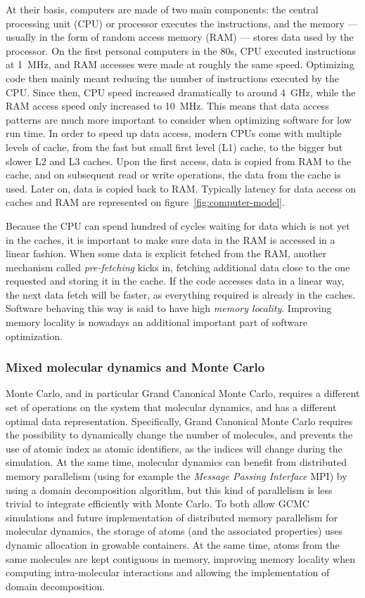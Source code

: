 \documentclass[thesis]{subfiles}
\begin{document}
At their basis, computers are made of two main components: the central
processing unit (CPU) or processor executes the instructions, and the memory ---
usually in the form of random access memory (RAM) --- stores data used by the
processor. On the first personal computers in the 80s, CPU executed instructions
at \SI{1}{MHz}, and RAM accesses were made at roughly the same speed. Optimizing
code then mainly meant reducing the number of instructions executed by the CPU.
Since then, CPU speed increased dramatically to around \SI{4}{GHz}, while the
RAM access speed only increased to \SI{10}{MHz}. This means that data access
patterns are much more important to consider when optimizing software for low
run time. In order to speed up data access, modern CPUs come with multiple
levels of cache, from the fast but small first level (L1) cache, to the bigger
but slower L2 and L3 caches. Upon the first access, data is copied from RAM to
the cache, and on subsequent read or write operations, the data from the cache
is used. Later on, data is copied back to RAM. Typically latency for data access
on caches and RAM are represented on figure~\ref{fig:computer-model}.

Because the CPU can spend hundred of cycles waiting for data which is not yet in
the caches, it is important to make sure data in the RAM is accessed in a linear
fashion. When some data is explicit fetched from the RAM, another mechanism
called \emph{pre-fetching} kicks in, fetching additional data close to the one
requested and storing it in the cache. If the code accesses data in a linear
way, the next data fetch will be faster, as everything required is already in
the caches. Software behaving this way is said to have high \emph{memory
locality}. Improving memory locality is nowadays an additional important part of
software optimization.

\subsubsection{Mixed molecular dynamics and Monte Carlo}

Monte Carlo, and in particular Grand Canonical Monte Carlo, requires a different
set of operations on the system that molecular dynamics, and has a different
optimal data representation. Specifically, Grand Canonical Monte Carlo requires
the possibility to dynamically change the number of molecules, and prevents the
use of atomic index as atomic identifiers, as the indices will change during the
simulation. At the same time, molecular dynamics can benefit from distributed
memory parallelism (using for example the \emph{Message Passing Interface} MPI)
by using a domain decomposition algorithm, but this kind of parallelism is less
trivial to integrate efficiently with Monte Carlo. To both allow GCMC
simulations and future implementation of distributed memory parallelism for
molecular dynamics, the storage of atoms (and the associated properties) uses
dynamic allocation in growable containers. At the same time, atoms from the same
molecules are kept contiguous in memory, improving memory locality when
computing intra-molecular interactions and allowing the implementation of domain
decomposition.
\end{document}
